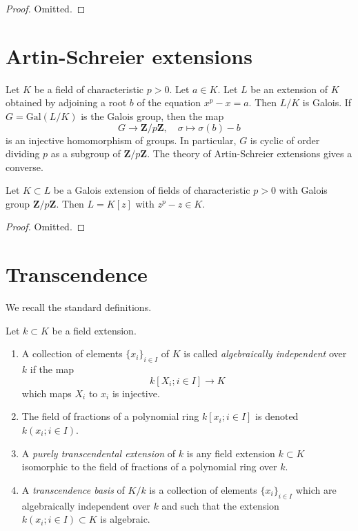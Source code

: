 \begin{proof}
Omitted.
\end{proof}




\section{Artin-Schreier extensions}
\label{section-Artin-Schreier}

\noindent
Let $K$ be a field of characteristic $p > 0$. Let $a \in K$. Let $L$ be an
extension of $K$ obtained by adjoining a root $b$ of the equation
$x^p - x = a$. Then $L/K$ is Galois. If $G = \text{Gal}(L/K)$ is the Galois
group, then the map
$$
G \longrightarrow \mathbf{Z}/p\mathbf{Z},\quad
\sigma \longmapsto \sigma(b) - b
$$
is an injective homomorphism of groups. In particular, $G$ is cyclic
of order dividing $p$ as a subgroup of $\mathbf{Z}/p\mathbf{Z}$.
The theory of Artin-Schreier extensions gives a converse.

\begin{lemma}
\label{lemma-Artin-Schreier}
Let $K \subset L$ be a Galois extension of fields of characteristic $p > 0$
with Galois group $\mathbf{Z}/p\mathbf{Z}$. Then $L = K[z]$ with
$z^p - z \in K$.
\end{lemma}

\begin{proof}
Omitted.
\end{proof}



\section{Transcendence}
\label{section-transcendence}

\noindent
We recall the standard definitions.

\begin{definition}
\label{definition-transcendence}
Let $k \subset K$ be a field extension.
\begin{enumerate}
\item A collection of elements $\{x_i\}_{i \in I}$ of $K$ is called
{\it algebraically independent} over $k$ if the map
$$
k[X_i; i\in I] \longrightarrow K
$$
which maps $X_i$ to $x_i$ is injective.
\item The field of fractions of a polynomial ring
$k[x_i; i \in I]$ is denoted $k(x_i; i\in I)$.
\item A {\it purely transcendental extension} of $k$ is any
field extension $k \subset K$ isomorphic to the field of
fractions of a polynomial ring over $k$.
\item A {\it transcendence basis} of $K/k$ is a
collection of elements $\{x_i\}_{i \in I}$ which are
algebraically independent over $k$ and such that
the extension $k(x_i; i\in I) \subset K$ is algebraic.
\end{enumerate}
\end{definition}

